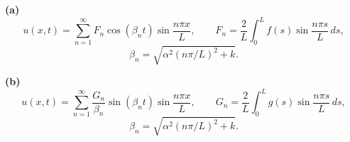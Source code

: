 \noindent\textbf{(a)} \[
u(x,t)=\sum_{n=1}^{\infty}F_n\cos(\beta_nt)\sin\frac{n\pi x}{L},
\qquad F_n=\frac2L\int_0^Lf(s)\sin\frac{n\pi s}{L}\,ds,\]
\[\beta_n=\sqrt{\alpha^2(n\pi/L)^2+k}.
\]

\noindent\textbf{(b)} \[
u(x,t)=\sum_{n=1}^{\infty}\frac{G_n}{\beta_n}\sin(\beta_nt)
\sin\frac{n\pi x}{L},\qquad
G_n=\frac2L\int_0^Lg(s)\sin\frac{n\pi s}{L}\,ds,\]
\[\beta_n=\sqrt{\alpha^2(n\pi/L)^2+k}.
\]
